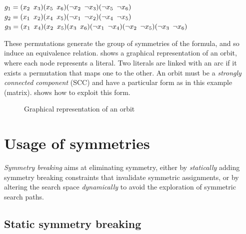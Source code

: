 \begin{center}
 \begin{minipage}[c]{.635\textwidth}
  $g_1 = (x_2 \enskip x_3)(x_5 \enskip x_6)(\neg x_2 \enskip \neg x_3)(\neg x_5 \enskip \neg x_6)$\\
  $g_2 = (x_1 \enskip x_2)(x_4 \enskip x_5)(\neg x_1 \enskip \neg x_2)(\neg x_4 \enskip \neg x_5)$\\
  $g_3 = (x_1 \enskip x_4)(x_2 \enskip x_5)(x_3 \enskip x_6)(\neg x_1 \enskip \neg x_4)(\neg x_2 \enskip \neg x_5)(\neg x_3 \enskip \neg x_6)$
 \end{minipage}
\end{center}

These permutations generate the group of symmetries of the formula,
and so induce an equivalence relation.
 shows a graphical representation of an orbit, where each node represents a literal.
Two literals are linked with an arc if it exists a permutation that maps one to the other. 
An orbit must be a \emph{strongly connected component} (SCC) and have a particular form as in this example (matrix).
  shows how to exploit this form.
\begin{figure}[!htbp]
 
 \caption{Graphical representation of an orbit}
 \label{fig:orbit}
\end{figure}

\section{Usage of symmetries}
\emph{Symmetry breaking} aims at eliminating symmetry, either
by \emph{statically} adding symmetry breaking constraints that invalidate symmetric
assignments, or by altering the search space \emph{dynamically} to avoid the exploration of symmetric search paths.




\subsection{Static symmetry breaking}

